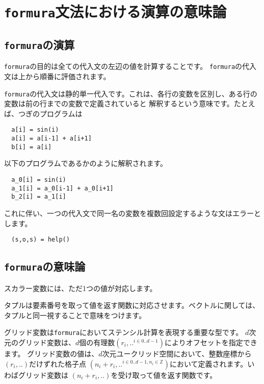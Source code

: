 \documentclass{jsarticle}
\newcommand{\bbZ}{\mathbb{Z}}
\newcommand{\formura}{{\texttt{formura}}}
\begin{document}
\newpage





\section{\formura 文法における演算の意味論}

%




\subsection{\formura の演算}

\formura の目的は全ての代入文の左辺の値を計算することです。
\formura の代入文は上から順番に評価されます。

\formura の代入文は静的単一代入です。これは、各行の変数を区別し、ある行の変数は前の行までの変数で定義されていると
解釈するという意味です。たとえば、つぎのプログラムは

\begin{lstlisting}
  a[i] = sin(i)
  a[i] = a[i-1] + a[i+1]
  b[i] = a[i]
\end{lstlisting}


以下のプログラムであるかのように解釈されます。
\begin{lstlisting}
  a_0[i] = sin(i)
  a_1[i] = a_0[i-1] + a_0[i+1]
  b_2[i] = a_1[i]
\end{lstlisting}


これに伴い、一つの代入文で同一名の変数を複数回設定するような文はエラーとします。
\begin{lstlisting}
  (s,o,s) = help()
\end{lstlisting}




\subsection{\formura の意味論}


スカラー変数には、ただ1つの値が対応します。

タプルは要素番号を取って値を返す関数に対応させます。ベクトルに関しては、タプルと同一視することで意味をつけます。

グリッド変数は\formura においてステンシル計算を表現する重要な型です。
$d$次元のグリッド変数は、$d$個の有理数$(r_i, .. ^{i \in 0 .. d-1})$によりオフセットを指定できます。
グリッド変数の値は、$d$次元ユークリッド空間において、整数座標から$(r_i, ..)$だけずれた格子点
$(n_i + r_i , .. ^{i \in 0..d-1, n_i \in \bbZ})$において定義されます。いわばグリッド変数は
$(n_i + r_i , ..)$を受け取って値を返す関数です。
\end{document}
